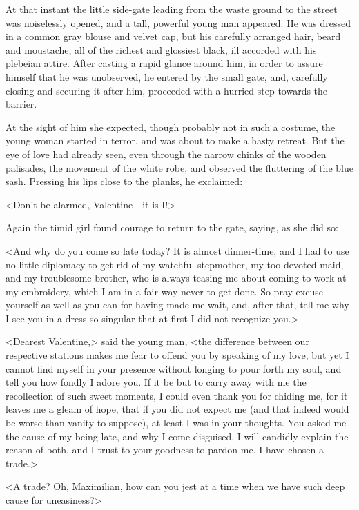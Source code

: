  At that instant the little side-gate leading from the waste ground to the street was noiselessly opened, and a tall, powerful young man appeared. He was dressed in a common gray blouse and velvet cap, but his carefully arranged hair, beard and moustache, all of the richest and glossiest black, ill accorded with his plebeian attire. After casting a rapid glance around him, in order to assure himself that he was unobserved, he entered by the small gate, and, carefully closing and securing it after him, proceeded with a hurried step towards the barrier. 

 At the sight of him she expected, though probably not in such a costume, the young woman started in terror, and was about to make a hasty retreat. But the eye of love had already seen, even through the narrow chinks of the wooden palisades, the movement of the white robe, and observed the fluttering of the blue sash. Pressing his lips close to the planks, he exclaimed: 

 <Don't be alarmed, Valentine—it is I!> 

 Again the timid girl found courage to return to the gate, saying, as she did so: 

 <And why do you come so late today? It is almost dinner-time, and I had to use no little diplomacy to get rid of my watchful stepmother, my too-devoted maid, and my troublesome brother, who is always teasing me about coming to work at my embroidery, which I am in a fair way never to get done. So pray excuse yourself as well as you can for having made me wait, and, after that, tell me why I see you in a dress so singular that at first I did not recognize you.> 

 <Dearest Valentine,> said the young man, <the difference between our respective stations makes me fear to offend you by speaking of my love, but yet I cannot find myself in your presence without longing to pour forth my soul, and tell you how fondly I adore you. If it be but to carry away with me the recollection of such sweet moments, I could even thank you for chiding me, for it leaves me a gleam of hope, that if you did not expect me (and that indeed would be worse than vanity to suppose), at least I was in your thoughts. You asked me the cause of my being late, and why I come disguised. I will candidly explain the reason of both, and I trust to your goodness to pardon me. I have chosen a trade.> 

 <A trade? Oh, Maximilian, how can you jest at a time when we have such deep cause for uneasiness?> 


